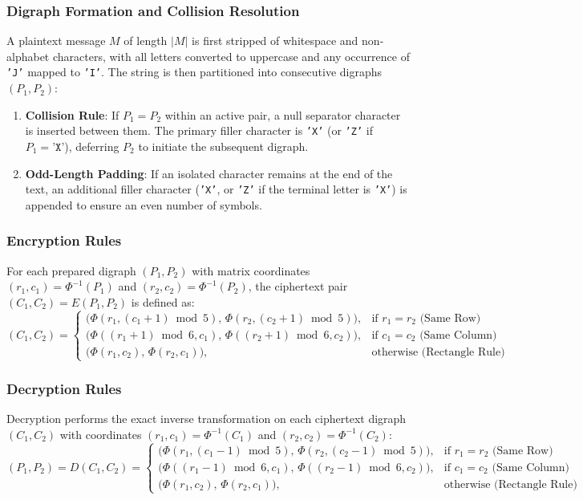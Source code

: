 \documentclass{labreport}
\begin{document}
\subsubsection{Digraph Formation and Collision Resolution}
A plaintext message $M$ of length $|M|$ is first stripped of whitespace and non-alphabet characters, with all letters converted to uppercase and any occurrence of \texttt{'J'} mapped to \texttt{'I'}. The string is then partitioned into consecutive digraphs $(P_1, P_2)$:
\begin{enumerate}
    \item \textbf{Collision Rule}: If $P_1 = P_2$ within an active pair, a null separator character is inserted between them. The primary filler character is \texttt{'X'} (or \texttt{'Z'} if $P_1 = \texttt{'X'}$), deferring $P_2$ to initiate the subsequent digraph.
    \item \textbf{Odd-Length Padding}: If an isolated character remains at the end of the text, an additional filler character (\texttt{'X'}, or \texttt{'Z'} if the terminal letter is \texttt{'X'}) is appended to ensure an even number of symbols.
\end{enumerate}

\subsubsection{Encryption Rules}
For each prepared digraph $(P_1, P_2)$ with matrix coordinates $(r_1, c_1) = \Phi^{-1}(P_1)$ and $(r_2, c_2) = \Phi^{-1}(P_2)$, the ciphertext pair $(C_1, C_2) = E(P_1, P_2)$ is defined as:
\begin{equation}
(C_1, C_2) =
\begin{cases}
\big(\Phi(r_1, (c_1 + 1) \bmod 5), \, \Phi(r_2, (c_2 + 1) \bmod 5)\big), & \text{if } r_1 = r_2 \text{ (Same Row)} \\[6pt]
\big(\Phi((r_1 + 1) \bmod 6, c_1), \, \Phi((r_2 + 1) \bmod 6, c_2)\big), & \text{if } c_1 = c_2 \text{ (Same Column)} \\[6pt]
\big(\Phi(r_1, c_2), \, \Phi(r_2, c_1)\big), & \text{otherwise (Rectangle Rule)}
\end{cases}
\end{equation}

\subsubsection{Decryption Rules}
Decryption performs the exact inverse transformation on each ciphertext digraph $(C_1, C_2)$ with coordinates $(r_1, c_1) = \Phi^{-1}(C_1)$ and $(r_2, c_2) = \Phi^{-1}(C_2)$:
\begin{equation}
(P_1, P_2) = D(C_1, C_2) =
\begin{cases}
\big(\Phi(r_1, (c_1 - 1) \bmod 5), \, \Phi(r_2, (c_2 - 1) \bmod 5)\big), & \text{if } r_1 = r_2 \text{ (Same Row)} \\[6pt]
\big(\Phi((r_1 - 1) \bmod 6, c_1), \, \Phi((r_2 - 1) \bmod 6, c_2)\big), & \text{if } c_1 = c_2 \text{ (Same Column)} \\[6pt]
\big(\Phi(r_1, c_2), \, \Phi(r_2, c_1)\big), & \text{otherwise (Rectangle Rule)}
\end{cases}
\end{equation}
\end{document}
